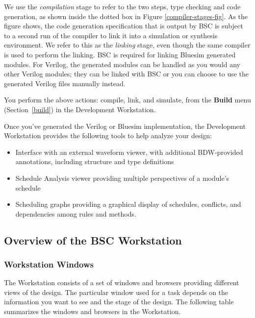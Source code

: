 \documentclass{article}
\begin{document}
We  use the {\em compilation} stage to refer
to the two steps, type checking  and code generation, as shown inside
the dotted box in Figure \ref{compiler-stages-fig}. As the figure
shows, the  code generation specification that is output
by BSC is subject to a second run of the compiler to link
it into a simulation or synthesis environment.  We  refer to this
as the 
{\em linking} stage, even though the same compiler is used to perform
the linking.
BSC is required for
linking Bluesim generated modules.  For Verilog, the generated modules
can be handled as you would any other Verilog modules; they can be
linked with BSC or you can choose to use the
generated Verilog files manually instead.

You perform the above actions: compile, link, and simulate, from the
{\bf Build} menu (Section~\ref{build}) in the Development Workstation.

Once you've generated the Verilog or Bluesim implementation, the
 Development Workstation provides the following  tools to help
 analyze your design:
\begin{itemize}
\item Interface with an external waveform viewer, with additional BDW-provided
 annotations, including  structure and type definitions
\item Schedule Analysis viewer providing multiple perspectives of a
module's schedule
\item Scheduling graphs providing a graphical display of schedules,
conflicts, and dependencies among rules and methods.
\end{itemize}


\subsection{Overview of the BSC Workstation}


\subsubsection{Workstation Windows}

The Workstation consists of a set of windows and browsers  providing
different views of the design.  The particular window used for a task
depends on the information you want to see and the stage of the
design.    The following table summarizes the
windows and browsers in the Workstation.
\end{document}
